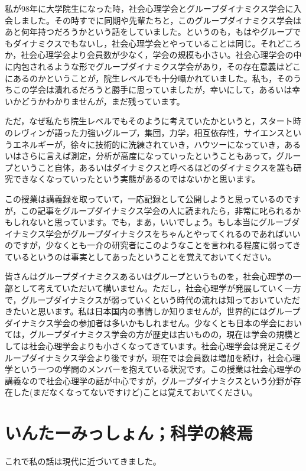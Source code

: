 \documentclass{ltjsbook}
\begin{document}
私が98年に大学院生になった時，社会心理学会とグループダイナミクス学会に入会しました。その時すでに同期や先輩たちと，このグループダイナミクス学会はあと何年持つだろうかという話をしていました。というのも，もはやグループでもダイナミクスでもないし，社会心理学会とやっていることは同じ。それどころか，社会心理学会より会員数が少なく，学会の規模も小さい。社会心理学会の中に内包されるような形でグループダイナミクス学会があり，その存在意義はどこにあるのかということが，院生レベルでも十分囁かれていました。私も，そのうちこの学会は潰れるだろうと勝手に思っていましたが，幸いにして，あるいは幸いかどうかわかりませんが，まだ残っています。

ただ，なぜ私たち院生レベルでもそのように考えていたかというと，スタート時のレヴィンが語った力強いグループ，集団，力学，相互依存性，サイエンスというエネルギーが，徐々に技術的に洗練されていき，ハウツーになっていき，あるいはさらに言えば測定，分析が高度になっていったということもあって，グループということ自体，あるいはダイナミクスと呼べるほどのダイナミクスを誰も研究できなくなっていったという実態があるのではないかと思います。

この授業は講義録を取っていて，一応記録として公開しようと思っているのですが，この記事をグループダイナミクス学会の人に読まれたら，非常に叱られるかもしれないと思っています。でも，まあ，いいでしょう。もし本当にグループダイナミクス学会がグループダイナミクスをちゃんとやってくれるのであればいいのですが，少なくとも一介の研究者にこのようなことを言われる程度に弱ってきているというのは事実としてあったということを覚えておいてください。

皆さんはグループダイナミクスあるいはグループというものを，社会心理学の一部として考えていただいて構いません。ただし，社会心理学が発展していく一方で，グループダイナミクスが弱っていくという時代の流れは知っておいていただきたいと思います。私は日本国内の事情しか知りませんが，世界的にはグループダイナミクス学会の参加者は多いかもしれません。少なくとも日本の学会においては，グループダイナミクス学会の方が歴史は古いものの，現在は学会の規模としては社会心理学会よりも小さくなってきています。社会心理学会は発足こそグループダイナミクス学会より後ですが，現在では会員数は増加を続け，社会心理学という一つの学問のメンバーを抱えている状況です。この授業は社会心理学の講義なので社会心理学の話が中心ですが，グループダイナミクスという分野が存在した(まだなくなってないですけど)ことは覚えておいてください。

\section{いんたーみっしょん；科学の終焉}
これで私の話は現代に近づいてきました。
\end{document}
